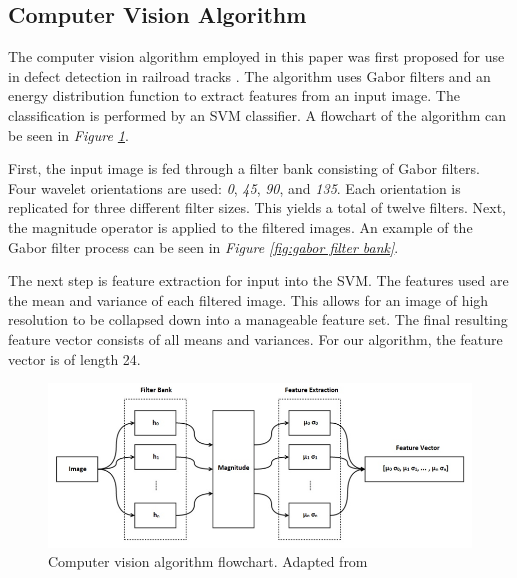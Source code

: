 \documentclass[letterpaper, 10 pt, conference]{ieeeconf}  %
\begin{document}
\subsection{Computer Vision Algorithm}

The computer vision algorithm employed in this paper was first proposed for use in defect detection in railroad tracks \cite{railDefect}. The algorithm uses Gabor filters and an energy distribution function to extract features from an input image. The classification is performed by an SVM classifier. A flowchart of the algorithm can be seen in \textit{Figure \ref{fig:vision algorithm diagram}}.

First, the input image is fed through a filter bank consisting of Gabor filters. Four wavelet orientations are used: \textit{0\degree}, \textit{45\degree}, \textit{90\degree}, and \textit{135\degree}. Each orientation is replicated for three different filter sizes. This yields a total of twelve filters. Next, the magnitude operator is applied to the filtered images. An example of the Gabor filter process can be seen in \textit{Figure \ref{fig:gabor filter bank}}.

The next step is feature extraction for input into the SVM. The features used are the mean and variance of each filtered image. This allows for an image of high resolution to be collapsed down into a manageable feature set. The final resulting feature vector consists of all means and variances. For our algorithm, the feature vector is of length 24.

\begin{figure}
    \centering
    \includegraphics[width=.75\textwidth]{computer_vision_diagram.png}
    \caption{Computer vision algorithm flowchart. Adapted from \cite{railDefect}}
    \vspace*{2mm}
    \label{fig:vision algorithm diagram}
\end{figure}
\end{document}
